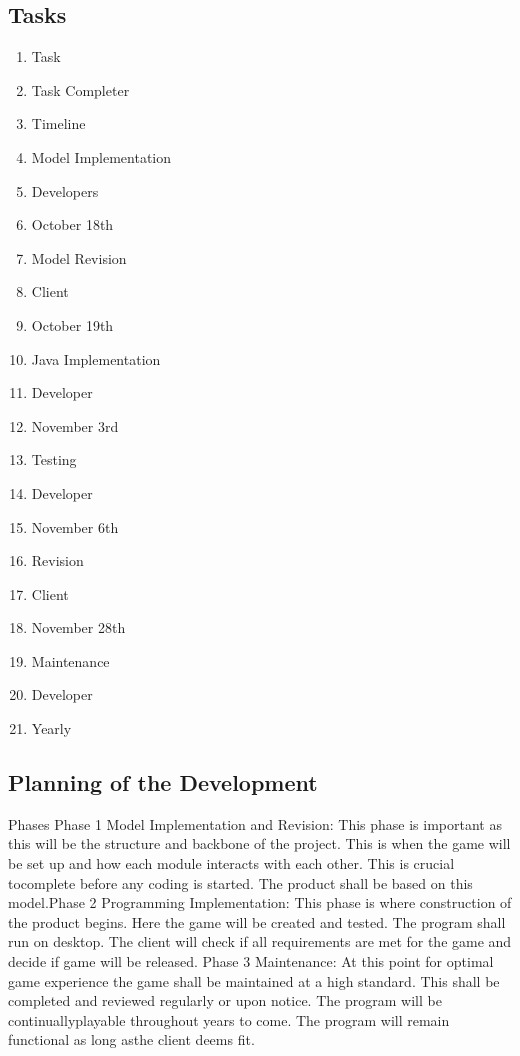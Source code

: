 \documentclass[12pt, titlepage]{article}
\begin{document}
\subsection{Tasks}
\begin{enumerate}
\item Task
\item Task Completer 
\item Timeline
\item Model Implementation
\item Developers
\item October 18th
\item Model Revision
\item Client
\item October 19th
\item Java Implementation
\item Developer
\item November 3rd
\item Testing
\item Developer
\item November 6th
\item Revision
\item Client
\item November 28th
\item Maintenance
\item Developer
\item Yearly
\end{enumerate}

\subsection{Planning of the Development } 

Phases Phase 1 Model Implementation and Revision: This phase is important as
this will be the structure and backbone of the project. This is when the game
will be set up and how each module interacts with each other. This is crucial
tocomplete before any coding is started. The product shall be based on this
model.Phase 2 Programming Implementation: This phase is where construction of
the
product begins. Here the game will be created and tested. The program shall run
on desktop. The client will check if all requirements are met for the game and
decide if game will be released. Phase 3 Maintenance: At this point for optimal
game experience the game shall be maintained at a high standard. This shall be
completed and reviewed regularly or upon notice. The program will be
continuallyplayable throughout years to come. The program will remain functional
as long asthe client deems fit.
\end{document}
